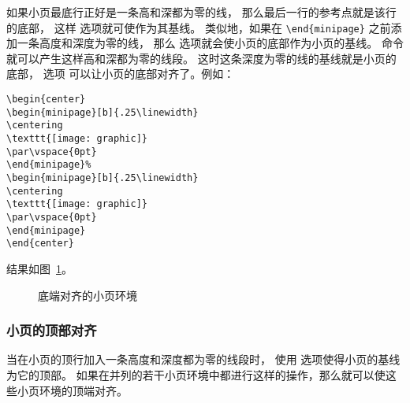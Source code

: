 如果小页最底行正好是一条高和深都为零的线，
那么最后一行的参考点就是该行的底部，
这样 \opt{[b]} 选项就可使作为其基线。
类似地，如果在 \verb|\end{minipage}| 之前添加一条高度和深度为零的线，
那么 \opt{[b]} 选项就会使小页的底部作为小页的基线。
命令  就可以产生这样高和深都为零的线段。
这时这条深度为零的线的基线就是小页的底部，
选项 \opt{[b]} 可以让小页的底部对齐了。例如：
\begin{lstlisting}
\begin{center}
\begin{minipage}[b]{.25\linewidth}
\centering
\texttt{[image: graphic]}
\par\vspace{0pt}
\end{minipage}%
\begin{minipage}[b]{.25\linewidth}
\centering
\texttt{[image: graphic]}
\par\vspace{0pt}
\end{minipage}
\end{center}
\end{lstlisting}
结果如图~\ref{fig:minipagesamp-2}。
\begin{figure}
\begin{center}
	\begin{minipage}[b]{.25\linewidth}
		\centering
		\resizebox{1in}{!}{\usebox{\boxgraphic}}
		\par\vspace{0pt}
	\end{minipage}%
	\begin{minipage}[b]{.25\linewidth}
		\centering
		\par\vspace{0pt}
	\end{minipage}
\end{center}
\caption{底端对齐的小页环境}\label{fig:minipagesamp-2}
\end{figure}

\subsubsection{小页的顶部对齐}
当在小页的顶行加入一条高度和深度都为零的线段时，
使用 \opt{[t]} 选项使得小页的基线为它的顶部。
如果在并列的若干小页环境中都进行这样的操作，那么就可以使这些小页环境的顶端对齐。

